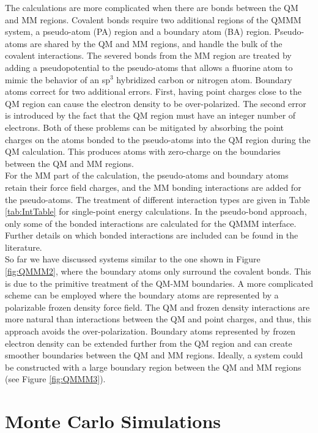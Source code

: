 \documentclass[12pt]{report}
\begin{document}
The calculations are more complicated when there are bonds between the QM and
MM regions. Covalent bonds require two additional regions of the QMMM system,
a pseudo-atom (PA) region and a boundary atom (BA) region. Pseudo-atoms are
shared by the QM and MM regions, and handle the bulk of the covalent
interactions. The severed bonds from the MM region are treated by adding a
pseudopotential to the pseudo-atoms that allows a fluorine atom to mimic the
behavior of an sp$^3$ hybridized carbon or nitrogen atom. Boundary atoms
correct for two additional errors. First, having point charges close to the
QM region can cause the electron density to be over-polarized. The second
error is introduced by the fact that the QM region must have an integer number
of electrons. Both of these problems can be mitigated by absorbing the point
charges on the atoms bonded to the pseudo-atoms into the QM region during the
QM calculation. This produces atoms with zero-charge on the boundaries between
the QM and MM regions. \\

For the MM part of the calculation, the pseudo-atoms and boundary atoms retain
their force field charges, and the MM bonding interactions are added for the
pseudo-atoms. The treatment of different interaction types are given in Table
\ref{tab:IntTable} for single-point energy calculations. In the pseudo-bond
approach, only some of the bonded interactions are calculated for the QMMM
interface. Further details on which bonded interactions are included can be
found in the literature. \\

So far we have discussed systems similar to the one shown in Figure
\ref{fig:QMMM2}, where the boundary atoms only surround the covalent bonds.
This is due to the primitive treatment of the QM-MM boundaries. A more
complicated scheme can be employed where the boundary atoms are represented by
a polarizable frozen density force field. The QM and frozen density
interactions are more natural than interactions between the QM and point
charges, and thus, this approach avoids the over-polarization. Boundary atoms
represented by frozen electron density can be extended further from the QM
region and can create smoother boundaries between the QM and MM regions.
Ideally, a system could be constructed with a large boundary region between
the QM and MM regions (see Figure \ref{fig:QMMM3}).

\FloatBarrier

\section{Monte Carlo Simulations}
\end{document}
